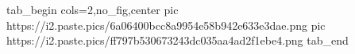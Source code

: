 
 
 
 
 
\zzSecCmtScr

\ifcmt
  tab_begin cols=2,no_fig,center
     pic https://i2.paste.pics/6a06400bcc8a9954e58b942e633e3dae.png
     pic https://i2.paste.pics/ff797b530673243dc035aa4ad2f1ebe4.png
  tab_end
\fi

